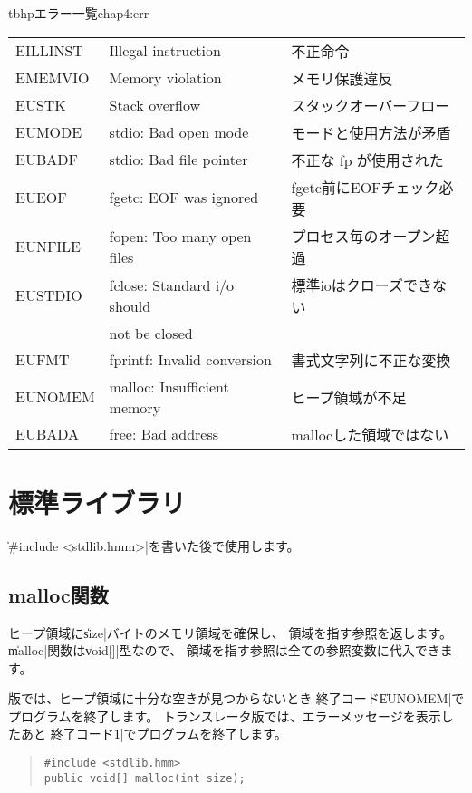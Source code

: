 \begin{mytable}{tbhp}{エラー一覧}{chap4:err}
\begin{tabular}{l|l|l}
EILLINST  & Illegal instruction         & 不正命令 \\
EMEMVIO   & Memory violation            & メモリ保護違反 \\
EUSTK     & Stack overflow              & スタックオーバーフロー \\
EUMODE    & stdio: Bad open mode        & モードと使用方法が矛盾 \\
EUBADF    & stdio: Bad file pointer     & 不正な fp が使用された \\
EUEOF     & fgetc: EOF was ignored      & fgetc前にEOFチェック必要 \\
EUNFILE   & fopen: Too many open files  & プロセス毎のオープン超過 \\
EUSTDIO   & fclose: Standard i/o should & 標準ioはクローズできない \\
          &  not be closed              &                          \\
EUFMT     & fprintf: Invalid conversion & 書式文字列に不正な変換 \\
EUNOMEM   & malloc: Insufficient memory & ヒープ領域が不足 \\
EUBADA    & free: Bad address           & mallocした領域ではない \\
\end{tabular}
\end{mytable}

\section{標準ライブラリ}

\|#include <stdlib.hmm>|を書いた後で使用します。

\subsection{malloc関数}

ヒープ領域に\|size|バイトのメモリ領域を確保し、
領域を指す参照を返します。
\|malloc|関数は\|void[]|型なので、
領域を指す参照は全ての参照変数に代入できます。

\tac 版では、ヒープ領域に十分な空きが見つからないとき
終了コード\|EUNOMEM|でプログラムを終了します。
トランスレータ版では、エラーメッセージを表示したあと
終了コード\|1|でプログラムを終了します。

\begin{quote}
\begin{verbatim}
#include <stdlib.hmm>
public void[] malloc(int size);
\end{verbatim}
\end{quote}

